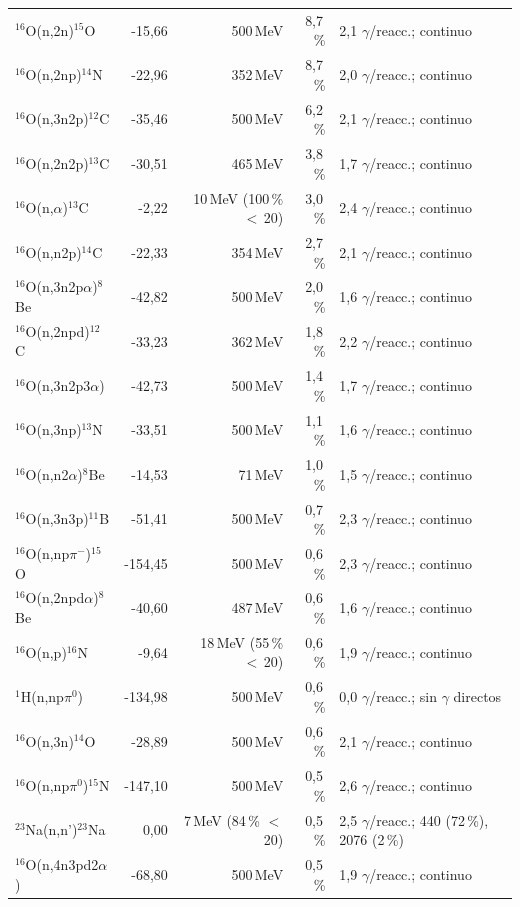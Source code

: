 \documentclass[11pt,a4paper]{article}
\begin{document}
{\begin{longtable}{p{4.4cm}rrrp{4.6cm}}
$^{16}$O(n,2n)$^{15}$O & -15,66 & 500\,MeV & 8,7\,\% & 2,1 $\gamma$/reacc.; continuo \\
$^{16}$O(n,2np)$^{14}$N & -22,96 & 352\,MeV & 8,7\,\% & 2,0 $\gamma$/reacc.; continuo \\
$^{16}$O(n,3n2p)$^{12}$C & -35,46 & 500\,MeV & 6,2\,\% & 2,1 $\gamma$/reacc.; continuo \\
$^{16}$O(n,2n2p)$^{13}$C & -30,51 & 465\,MeV & 3,8\,\% & 1,7 $\gamma$/reacc.; continuo \\
$^{16}$O(n,$\alpha$)$^{13}$C & -2,22 & 10\,MeV (100\,\% $<$\,20) & 3,0\,\% & 2,4 $\gamma$/reacc.; continuo \\
$^{16}$O(n,n2p)$^{14}$C & -22,33 & 354\,MeV & 2,7\,\% & 2,1 $\gamma$/reacc.; continuo \\
$^{16}$O(n,3n2p$\alpha$)$^{8}$Be & -42,82 & 500\,MeV & 2,0\,\% & 1,6 $\gamma$/reacc.; continuo \\
$^{16}$O(n,2npd)$^{12}$C & -33,23 & 362\,MeV & 1,8\,\% & 2,2 $\gamma$/reacc.; continuo \\
$^{16}$O(n,3n2p3$\alpha$) & -42,73 & 500\,MeV & 1,4\,\% & 1,7 $\gamma$/reacc.; continuo \\
$^{16}$O(n,3np)$^{13}$N & -33,51 & 500\,MeV & 1,1\,\% & 1,6 $\gamma$/reacc.; continuo \\
$^{16}$O(n,n2$\alpha$)$^{8}$Be & -14,53 & 71\,MeV & 1,0\,\% & 1,5 $\gamma$/reacc.; continuo \\
$^{16}$O(n,3n3p)$^{11}$B & -51,41 & 500\,MeV & 0,7\,\% & 2,3 $\gamma$/reacc.; continuo \\
$^{16}$O(n,np$\pi^-$)$^{15}$O & -154,45 & 500\,MeV & 0,6\,\% & 2,3 $\gamma$/reacc.; continuo \\
$^{16}$O(n,2npd$\alpha$)$^{8}$Be & -40,60 & 487\,MeV & 0,6\,\% & 1,6 $\gamma$/reacc.; continuo \\
$^{16}$O(n,p)$^{16}$N & -9,64 & 18\,MeV (55\,\% $<$\,20) & 0,6\,\% & 1,9 $\gamma$/reacc.; continuo \\
$^{1}$H(n,np$\pi^0$) & -134,98 & 500\,MeV & 0,6\,\% & 0,0 $\gamma$/reacc.; sin $\gamma$ directos \\
$^{16}$O(n,3n)$^{14}$O & -28,89 & 500\,MeV & 0,6\,\% & 2,1 $\gamma$/reacc.; continuo \\
$^{16}$O(n,np$\pi^0$)$^{15}$N & -147,10 & 500\,MeV & 0,5\,\% & 2,6 $\gamma$/reacc.; continuo \\
$^{23}$Na(n,n')$^{23}$Na & 0,00 & 7\,MeV (84\,\% $<$\,20) & 0,5\,\% & 2,5 $\gamma$/reacc.; 440 (72\,\%), 2076 (2\,\%) \\
$^{16}$O(n,4n3pd2$\alpha$) & -68,80 & 500\,MeV & 0,5\,\% & 1,9 $\gamma$/reacc.; continuo \\

\end{longtable}}
\end{document}
